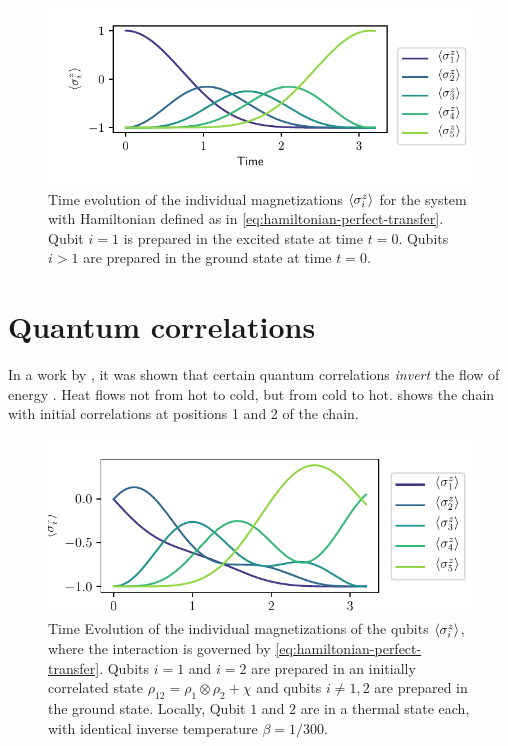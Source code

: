 \documentclass[a4paper,11pt]{scrartcl}
\begin{document}
\begin{figure}[H]
    \centering
    \includegraphics{expval_z.pdf}
    \caption{Time evolution of the individual magnetizations $\expval{\sigma^z_i}$ for the system with
    Hamiltonian defined as in \cref{eq:hamiltonian-perfect-transfer}.
    Qubit $i=1$ is prepared in the excited state at time $t=0$.
    Qubits $i>1$ are prepared in the ground state at time $t=0$.}
    \label{fig:no-corr}
\end{figure}
\section{Quantum correlations}
In a work by \citeauthor{BA_kaonan_correlations}, it was shown that certain quantum correlations
\emph{invert} the flow of energy \cite{BA_kaonan_correlations}. Heat flows not from hot to cold, but
from cold to hot.  shows the chain with initial correlations at positions 1 and 2 of the chain.
\begin{figure}
    \centering
    \includegraphics{12_expval_z.pdf}
    \caption{Time Evolution of the individual magnetizations of the qubits
    $\expval{\sigma^z_i}$, where the interaction is governed by \cref{eq:hamiltonian-perfect-transfer}.
    Qubits $i=1$ and $i=2$ are prepared in an initially correlated state $\rho_{12} = \rho_1 \otimes \rho_2 + \chi$
    and qubits $i\neq1,2$ are prepared in the ground state.
    Locally, Qubit $1$ and $2$ are in a thermal state each, with identical inverse temperature $\beta = 1/300$.}
    \label{fig:corr}
\end{figure}
\end{document}
